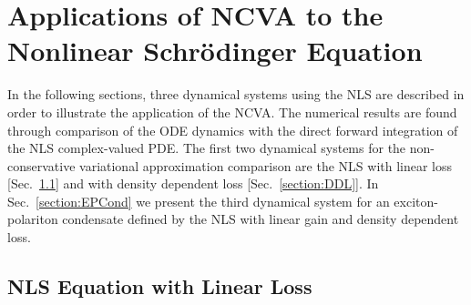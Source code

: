 \chapter{Applications of NCVA to the Nonlinear Schr\"{o}dinger Equation}
\label{chap:Results}

In the following sections, three dynamical systems using the NLS are described in order to illustrate the application of the NCVA.  The numerical results are found through comparison of the ODE dynamics with the direct forward integration of the NLS complex-valued PDE.  The first two dynamical systems for the non-conservative variational approximation comparison are the NLS with linear loss [Sec.~\ref{section:LinearLoss}] and with density dependent loss [Sec.~\ref{section:DDL}].  In Sec.~\ref{section:EPCond} we present the third dynamical system for an exciton-polariton condensate defined by the NLS with linear gain and density dependent loss.  

\section[Nonlinear Schr\"{o}dinger Equation with Linear Loss]{NLS Equation with Linear Loss}
\label{section:LinearLoss}


